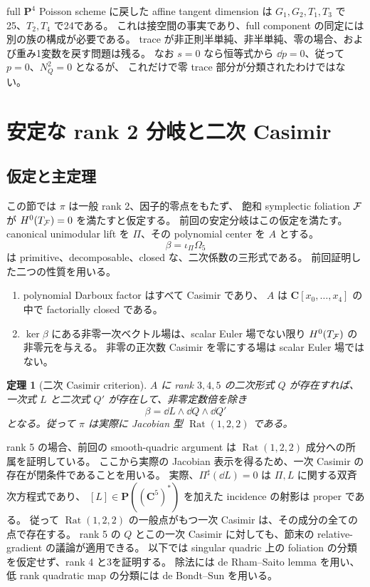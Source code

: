 \documentclass[11pt,a4paper]{ltjsarticle}
\newcommand{\PP}{\mathbf P}\renewcommand{\AA}{\mathbf A}\newcommand{\CC}{\mathbf C}\newcommand{\QQ}{\mathbf Q}
\DeclareMathOperator{\Rat}{Rat}\DeclareMathOperator{\Aff}{Aff}\DeclareMathOperator{\Aut}{Aut}
\newtheorem{theorem}{定理}[section]\newtheorem{proposition}[theorem]{命題}\newtheorem{lemma}[theorem]{補題}\newtheorem{corollary}[theorem]{系}
\theoremstyle{remark}\newtheorem{remark}[theorem]{注意}\renewcommand{\proofname}{証明}
\begin{document}
full $\PP^4$ Poisson scheme に戻した affine tangent dimension は
$G_1,G_2,T_1,T_3$ で25、$T_2,T_4$ で24である。
これは接空間の事実であり、full component の同定には別の族の構成が必要である。
trace が非正則半単純、非半単純、零の場合、および重み1変数を戻す問題は残る。
なお $s=0$ なら恒等式から $\dd p=0$、従って $p=0$、$N_Q^2=0$ となるが、
これだけで零 trace 部分が分類されたわけではない。

\section{安定な rank 2 分岐と二次 Casimir}\label{sec:stable}
\subsection{仮定と主定理}
この節では $\pi$ は一般 rank 2、因子的零点をもたず、
飽和 symplectic foliation $\mathcal F$ が $H^0(T_\mathcal F)=0$ を満たすと仮定する。
前回の安定分岐はこの仮定を満たす。
canonical unimodular lift を $\Pi$、その polynomial center を $A$ とする。
\[
 \beta=\iota_\Pi\Omega_5
\]
は primitive、decomposable、closed な、二次係数の三形式である。
前回証明した二つの性質を用いる。
\begin{enumerate}
 \item polynomial Darboux factor はすべて Casimir であり、
 $A$ は $\CC[x_0,\ldots,x_4]$ の中で factorially closed である。
 \item $\ker\beta$ にある非零一次ベクトル場は、scalar Euler 場でない限り
 $H^0(T_\mathcal F)$ の非零元を与える。
 非零の正次数 Casimir を零にする場は scalar Euler 場ではない。
\end{enumerate}

\begin{theorem}[二次 Casimir criterion]\label{thm:casimir}
$A$ に rank $3,4,5$ の二次形式 $Q$ が存在すれば、
一次式 $L$ と二次式 $Q'$ が存在して、非零定数倍を除き
\[
 \beta=\dd L\wedge\dd Q\wedge\dd Q'
\]
となる。従って $\pi$ は実際に Jacobian 型 $\Rat(1,2,2)$ である。
\end{theorem}

rank 5 の場合、前回の smooth-quadric argument は
$\Rat(1,2,2)$ 成分への所属を証明している。
ここから実際の Jacobian 表示を得るため、一次 Casimir の存在が閉条件であることを用いる。
実際、$\Pi^\sharp(\dd L)=0$ は $\Pi,L$ に関する双斉次方程式であり、
$[L]\in\PP((\CC^5)^*)$ を加えた incidence の射影は proper である。
従って $\Rat(1,2,2)$ の一般点がもつ一次 Casimir は、その成分の全ての点で存在する。
rank 5 の $Q$ とこの一次 Casimir に対しても、節末の relative-gradient の議論が適用できる。
以下では singular quadric 上の foliation の分類を仮定せず、rank 4 と3を証明する。
除法には de Rham--Saito lemma \cite{Saito} を用い、
低 rank quadratic map の分類には de Bondt--Sun \cite[Theorems 2.1, 3.1]{DBS} を用いる。
\end{document}
